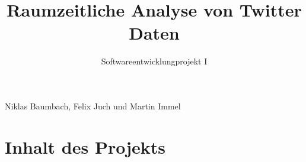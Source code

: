 \documentclass[12pt, xcolor={usenames,dvipsnames,svgnames,x11names,table}]{beamer}
\title{Raumzeitliche Analyse von Twitter Daten}
\subtitle{Softwareentwicklungprojekt I}
\date{}
\begin{document}
	\begin{frame}
	 	\titlepage\vspace{-2cm}
	 	\center Niklas Baumbach, Felix Juch und Martin Immel
	\end{frame}	
	
	
	\section{Inhalt des Projekts}
\end{document}
